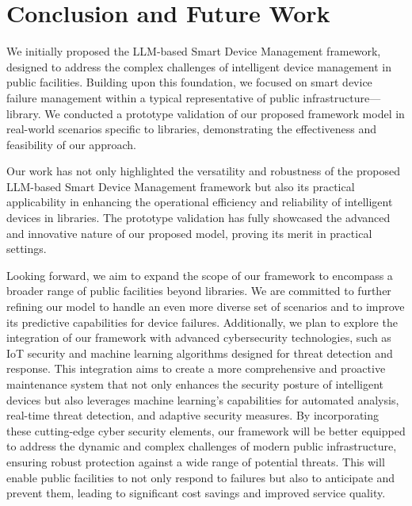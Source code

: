 \documentclass[preprint,12pt]{elsarticle}
\begin{document}
\section{Conclusion and Future Work}

We initially proposed the LLM-based Smart Device Management framework, designed to address the complex challenges of intelligent device management in public facilities. Building upon this foundation, we focused on smart device failure management within a typical representative of public infrastructure— library. We conducted a prototype validation of our proposed framework model in real-world scenarios specific to libraries, demonstrating the effectiveness and feasibility of our approach.

Our work has not only highlighted the versatility and robustness of the proposed LLM-based Smart Device Management framework but also its practical applicability in enhancing the operational efficiency and reliability of intelligent devices in libraries. The prototype validation has fully showcased the advanced and innovative nature of our proposed model, proving its merit in practical settings.

Looking forward, we aim to expand the scope of our framework to encompass a broader range of public facilities beyond libraries. We are committed to further refining our model to handle an even more diverse set of scenarios and to improve its predictive capabilities for device failures. Additionally, we plan to explore the integration of our framework with advanced cybersecurity technologies, such as IoT security and machine learning algorithms designed for threat detection and response. This integration aims to create a more comprehensive and proactive maintenance system that not only enhances the security posture of intelligent devices but also leverages machine learning's capabilities for automated analysis, real-time threat detection, and adaptive security measures. By incorporating these cutting-edge cyber security elements, our framework will be better equipped to address the dynamic and complex challenges of modern public infrastructure, ensuring robust protection against a wide range of potential threats. This will enable public facilities to not only respond to failures but also to anticipate and prevent them, leading to significant cost savings and improved service quality.








%
%
%
\end{document}
